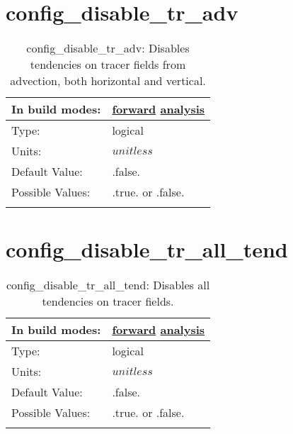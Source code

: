 \section[config\_disable\_tr\_adv]{config\_disable\_tr\_adv}
\label{sec:nm_sec_config_disable_tr_adv}
\begin{center}
\begin{longtable}{| p{2.0in} || p{4.0in} |}
    \hline
    In build modes: & \hyperref[subsec:forward_nm_tab_debug]{forward} \hyperref[subsec:analysis_nm_tab_debug]{analysis} \\
    \hline
    Type: & logical \\
    \hline
    Units: & $unitless$ \\
    \hline
    Default Value: & .false. \\
    \hline
    Possible Values: & .true. or .false. \\
    \hline
    \caption{config\_disable\_tr\_adv: Disables tendencies on tracer fields from advection, both horizontal and vertical.}
\end{longtable}
\end{center}
\section[config\_disable\_tr\_all\_tend]{config\_disable\_tr\_all\_tend}
\label{sec:nm_sec_config_disable_tr_all_tend}
\begin{center}
\begin{longtable}{| p{2.0in} || p{4.0in} |}
    \hline
    In build modes: & \hyperref[subsec:forward_nm_tab_debug]{forward} \hyperref[subsec:analysis_nm_tab_debug]{analysis} \\
    \hline
    Type: & logical \\
    \hline
    Units: & $unitless$ \\
    \hline
    Default Value: & .false. \\
    \hline
    Possible Values: & .true. or .false. \\
    \hline
    \caption{config\_disable\_tr\_all\_tend: Disables all tendencies on tracer fields.}
\end{longtable}
\end{center}
